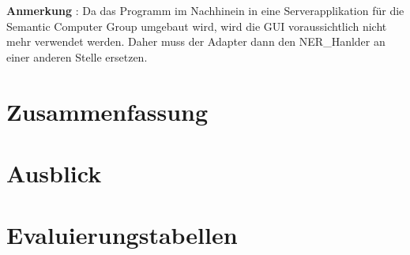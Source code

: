 \documentclass[11pt, a4paper, oneside]{Thesis} %
\begin{document}
\textbf{Anmerkung} : Da das Programm im Nachhinein in eine Serverapplikation f\"ur die Semantic Computer Group umgebaut wird, wird die GUI voraussichtlich nicht mehr verwendet werden. Daher muss der Adapter dann den NER\_Hanlder an einer anderen Stelle ersetzen.

\chapter{Zusammenfassung}
\chapter{Ausblick}


\makeglossaries
{}

\printglossary


\appendix %
\chapter{Evaluierungstabellen}






\backmatter


\label{Quellen}


\end{document}
